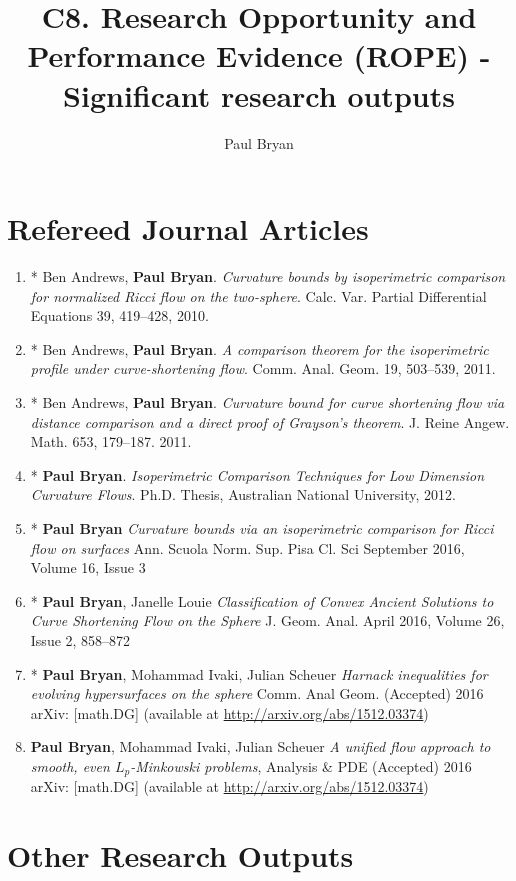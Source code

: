\documentclass[12pt]{amsart}
\date{}
\author{Paul Bryan}
\date{}
\title{C8. Research Opportunity and Performance Evidence (ROPE) - Significant research outputs}
\begin{document}
\onehalfspacing

\maketitle

\section*{\textbf{Refereed Journal Articles}}
\label{sec-1}

\begin{enumerate}
\item * Ben Andrews, \textbf{Paul Bryan}. \emph{Curvature bounds by isoperimetric comparison for normalized Ricci flow on the two-sphere}. Calc. Var. Partial Differential Equations 39, 419--428, 2010.
\item * Ben Andrews, \textbf{Paul Bryan}. \emph{A comparison theorem for the isoperimetric profile under curve-shortening flow}. Comm. Anal. Geom. 19, 503--539, 2011.
\item * Ben Andrews, \textbf{Paul Bryan}. \emph{Curvature bound for curve shortening flow via distance comparison and a direct proof of Grayson's theorem}. J. Reine Angew. Math. 653, 179--187. 2011.
\item * \textbf{Paul Bryan}. \emph{Isoperimetric Comparison Techniques for Low Dimension Curvature Flows}. Ph.D. Thesis, Australian National University, 2012.
\item * \textbf{Paul Bryan} \emph{Curvature bounds via an isoperimetric comparison for Ricci flow on surfaces} Ann. Scuola Norm. Sup. Pisa Cl. Sci September 2016, Volume 16, Issue 3
\item * \textbf{Paul Bryan}, Janelle Louie \emph{Classification of Convex Ancient Solutions to Curve Shortening Flow on the Sphere} J. Geom. Anal. April 2016, Volume 26, Issue 2, 858--872
\item * \textbf{Paul Bryan}, Mohammad Ivaki, Julian Scheuer \emph{Harnack inequalities for evolving hypersurfaces on the sphere} Comm. Anal Geom. (Accepted) 2016 arXiv: [math.DG] (available at \url{http://arxiv.org/abs/1512.03374})
\item \textbf{Paul Bryan}, Mohammad Ivaki, Julian Scheuer \emph{A unified flow approach to smooth, even $L_p$-Minkowski problems}, Analysis \& PDE (Accepted) 2016 arXiv: [math.DG] (available at \url{http://arxiv.org/abs/1512.03374})
\end{enumerate}

\section*{\textbf{Other Research Outputs}}
\label{sec-2}
\end{document}
